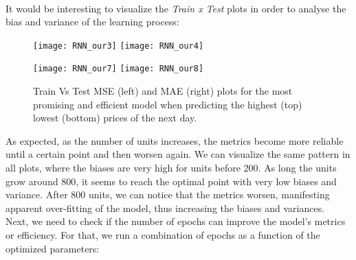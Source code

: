 \begin{table}[H]
\centering
{}
\label{table:Tanh, 1, 800, 50, 1, MSE}
\caption{Summary of parameters for our best model.}
\end{table}\\

It would be interesting to visualize the \textit{Train x Test} plots in order to analyse the bias and variance of the learning process:\\

\begin{figure}[H]
\label{fig:RNN train vs test for highest}
\centering
\texttt{[image: RNN\_our3]}
\texttt{[image: RNN\_our4]}
\end{figure}

\begin{figure}[H]
\label{fig:RNN train vs test for lowest}
\centering
\texttt{[image: RNN\_our7]}
\texttt{[image: RNN\_our8]}
\caption{Train Vs Test MSE (left) and MAE (right) plots for the most promising and efficient model when predicting the highest (top) lowest (bottom) prices of the next day.}
\end{figure}

As expected, as the number of units increases, the metrics become more reliable until a certain point and then worsen again. We can visualize the same pattern in all plots, where the biases are very high for units before 200. As long the units grow around 800, it seems to reach the optimal point with very low biases and variance. After 800 units, we can notice that the metrics worsen, manifesting apparent over-fitting of the model, thus increasing the biases and variances.\\

Next, we need to check if the number of epochs can improve the model's metrics or efficiency. For that, we run a combination of epochs as a function of the optimized parameters:

